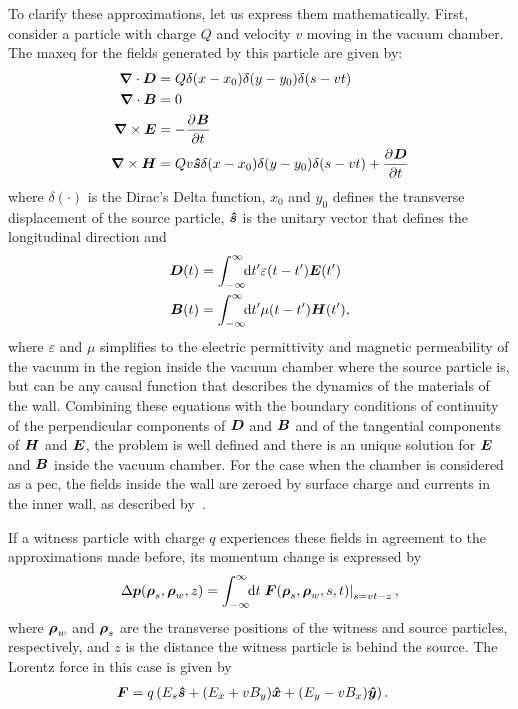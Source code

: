    To clarify these approximations, let us express them mathematically. First, consider a particle with charge $Q$ and velocity $v$  moving in the vacuum chamber. The \gls{maxeq} for the fields generated by this particle are given by:
    \begin{align}\label{eq:maxeq}
	  	\nonumber
      	\boldsymbol{\nabla}\cdot\boldsymbol{D} &= Q\delta(x-x_0)\delta(y-y_0)\delta(s-vt)\\ \nonumber
	  	\boldsymbol{\nabla}\cdot\boldsymbol{B} &= 0\\
	  	\boldsymbol{\nabla}\times\boldsymbol{E} &= -\frac{\partial^{{}}\boldsymbol{B}}{\partial t^{{}}}\\
	  	\nonumber
	  	\boldsymbol{\nabla}\times\boldsymbol{H} &= Qv\boldsymbol{\hat s}\delta(x-x_0)\delta(y-y_0)\delta(s-vt) + 		\frac{\partial^{{}}\boldsymbol{D}}{\partial t^{{}}}
    \end{align}
    where $\delta(\cdot)$ is the Dirac's Delta function, $x_0$ and $y_0$ defines the transverse displacement of the source particle, $\boldsymbol{\hat s}$ is the unitary vector that defines the longitudinal direction and
    \begin{align}
  	  	\boldsymbol{D}(t) &= \int_{-\infty}^{\infty}\!\!\text{d}t' \varepsilon(t-t')\boldsymbol{E}(t')\\
	  	\boldsymbol{B}(t) &= \int_{-\infty}^{\infty}\!\!\text{d}t' \mu(t-t')\boldsymbol{H}(t'),
    \end{align}
    where $\varepsilon$ and $\mu$ simplifies to the electric permittivity and magnetic permeability of the vacuum in the region inside the vacuum chamber where the source particle is, but can be any causal function that describes the dynamics of the materials of the wall. Combining these equations with the boundary conditions of continuity of the perpendicular components of $\boldsymbol{D}$ and $\boldsymbol{B}$ and of the tangential components of $\boldsymbol{H}$ and $\boldsymbol{E}$, the problem is well defined and there is an unique solution for $\boldsymbol{E}$ and $\boldsymbol{B}$ inside the vacuum chamber. For the case when the chamber is considered as a \gls{pec}, the fields inside the wall are zeroed by surface charge and currents in the inner wall, as described by~.

    If a witness particle with charge $q$ experiences these fields in agreement to the approximations made before, its momentum change is expressed by
    \begin{align}\label{eq:momentum_gain}
  	  	\Delta \boldsymbol{p}(\boldsymbol{\rho}_s, \boldsymbol{\rho}_w, z) = \int_{-\infty}^{\infty}\!\!\text{d}t \left.\boldsymbol{F}(\boldsymbol{\rho}_s, \boldsymbol{\rho}_w, s, t)\right|_{s=vt-z},
    \end{align}
    where $\boldsymbol{\rho}_w$ and $\boldsymbol{\rho}_s$ are the transverse positions of the witness and source particles, respectively, and $z$ is the distance the witness particle is behind the source. The Lorentz force in this case is given by
    \begin{align}\label{eq:lorentz_force}
  	  	\boldsymbol{F} &= q\left(E_s\boldsymbol{\hat s} + (E_x+vB_y)\boldsymbol{\hat x} + (E_y-vB_x)\boldsymbol{\hat y}\right).
    \end{align}

